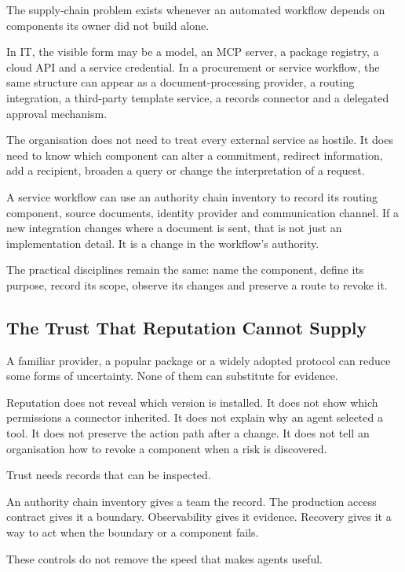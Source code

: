 The supply-chain problem exists whenever an automated workflow depends
on components its owner did not build alone.

In IT, the visible form may be a model, an MCP server, a package
registry, a cloud API and a service credential. In a procurement or
service workflow, the same structure can appear as a document-processing
provider, a routing integration, a third-party template service, a
records connector and a delegated approval mechanism.

The organisation does not need to treat every external service as
hostile. It does need to know which component can alter a commitment,
redirect information, add a recipient, broaden a query or change the
interpretation of a request.

A service workflow can use an authority chain inventory to record its
routing component, source documents, identity provider and communication
channel. If a new integration changes where a document is sent, that is
not just an implementation detail. It is a change in the workflow's
authority.

The practical disciplines remain the same: name the component, define
its purpose, record its scope, observe its changes and preserve a route
to revoke it.

\subsection{The Trust That Reputation Cannot
Supply}\label{the-trust-that-reputation-cannot-supply}

A familiar provider, a popular package or a widely adopted protocol can
reduce some forms of uncertainty. None of them can substitute for
evidence.

Reputation does not reveal which version is installed. It does not show
which permissions a connector inherited. It does not explain why an
agent selected a tool. It does not preserve the action path after a
change. It does not tell an organisation how to revoke a component when
a risk is discovered.

Trust needs records that can be inspected.

An authority chain inventory gives a team the record. The production
access contract gives it a boundary. Observability gives it evidence.
Recovery gives it a way to act when the boundary or a component fails.

These controls do not remove the speed that makes agents useful.

